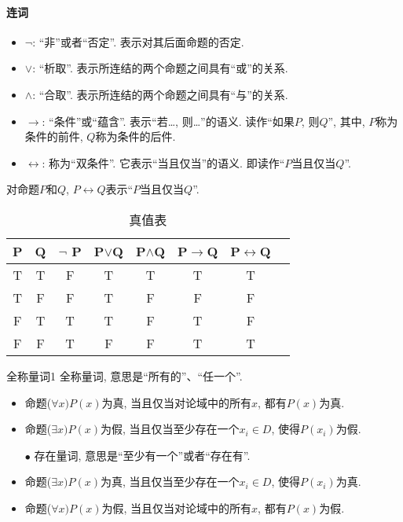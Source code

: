 \paragraph{连词}
\begin{itemize}
\item  $\neg$: “非”或者“否定”. 表示对其后面命题的否定.
\item  $\vee$: “析取”. 表示所连结的两个命题之间具有“或”的关系.
\item $\wedge$: “合取”.  表示所连结的两个命题之间具有“与”的关系.
\item $\rightarrow$: “条件”或“蕴含”. 表示“若…, 则…”的语义. 读作“如果$P$, 则$Q$”, 其中, $P$称为条件的前件, $Q$称为条件的后件.
\item $\leftrightarrow$: 称为“双条件”. 它表示“当且仅当”的语义. 即读作“$P$当且仅当$Q$”.
\end{itemize}
\begin{example}
对命题$P$和$Q$, $P \leftrightarrow Q$表示“$P$当且仅当$Q$”.
\begin{table} [H]
\caption{真值表}
\vspace{-0.7cm}
\begin{center}
 \begin{tabular} {cccccccc}
  \hline
P	&Q&	$\neg$ P	&P$\vee$Q&	P$\wedge$Q	&P$\rightarrow$Q	&P$\leftrightarrow$Q\\
  \hline
T&  T&	F&	T&	T&	T&	T\\
T&	F&	F&	T&	F&	F&	F\\
F&	T&	T&	T&	F&	T&	F\\
F&	F&	T&	F&	F&	T&	T\\
\hline
\end{tabular}
\end{center}
\label{AI32_table1}
\end{table}
\end{example}
\begin{mydef}{全称量词}{1}
全称量词, 意思是“所有的”、“任一个”.
\end{mydef}

\begin{itemize}
\item 命题($\forall x)P(x)$为真, 当且仅当对论域中的所有$x$, 都有$P(x)$为真.
\item 命题($\exists x)P(x)$为假, 当且仅当至少存在一个$x_i\in D$, 使得$P(x_i)$为假.

\quad $\bullet$ 存在量词, 意思是“至少有一个”或者“存在有”.
\item 命题($\exists  x)P(x)$为真, 当且仅当至少存在一个$x_i\in D$, 使得$P(x_i)$为真.
\item 命题($\forall x)P(x)$为假, 当且仅当对论域中的所有$x$, 都有$P(x)$为假.
\end{itemize}

